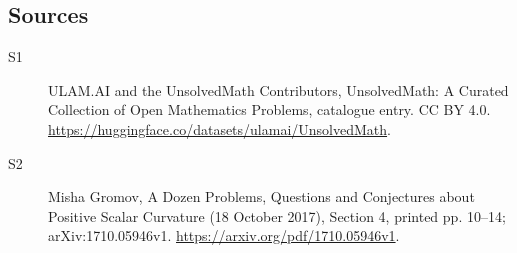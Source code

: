 \documentclass[11pt]{article}
\begin{document}
\subsection{Sources}
\begin{description}
\item[\hypertarget{source:statement:1}{S1}] ULAM.AI and the UnsolvedMath Contributors, UnsolvedMath: A Curated Collection of Open Mathematics Problems, catalogue entry. CC BY 4.0. \url{https://huggingface.co/datasets/ulamai/UnsolvedMath}.
\item[\hypertarget{source:statement:2}{S2}] Misha Gromov, A Dozen Problems, Questions and Conjectures about Positive Scalar Curvature (18 October 2017), Section 4, printed pp. 10--14; arXiv:1710.05946v1. \url{https://arxiv.org/pdf/1710.05946v1}.
\end{description}
\label{end:statement}
\end{document}
